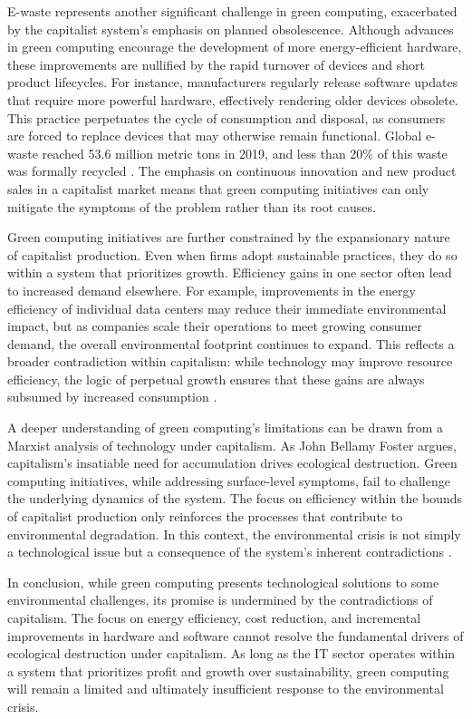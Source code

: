 \begin{refsection}
E-waste represents another significant challenge in green computing, exacerbated by the capitalist system’s emphasis on planned obsolescence. Although advances in green computing encourage the development of more energy-efficient hardware, these improvements are nullified by the rapid turnover of devices and short product lifecycles. For instance, manufacturers regularly release software updates that require more powerful hardware, effectively rendering older devices obsolete. This practice perpetuates the cycle of consumption and disposal, as consumers are forced to replace devices that may otherwise remain functional. Global e-waste reached 53.6 million metric tons in 2019, and less than 20\% of this waste was formally recycled \cite[pp.~2-4]{forti2020global}. The emphasis on continuous innovation and new product sales in a capitalist market means that green computing initiatives can only mitigate the symptoms of the problem rather than its root causes.

Green computing initiatives are further constrained by the expansionary nature of capitalist production. Even when firms adopt sustainable practices, they do so within a system that prioritizes growth. Efficiency gains in one sector often lead to increased demand elsewhere. For example, improvements in the energy efficiency of individual data centers may reduce their immediate environmental impact, but as companies scale their operations to meet growing consumer demand, the overall environmental footprint continues to expand. This reflects a broader contradiction within capitalism: while technology may improve resource efficiency, the logic of perpetual growth ensures that these gains are always subsumed by increased consumption \cite[pp.~84-87]{foster2000ecology}.

A deeper understanding of green computing’s limitations can be drawn from a Marxist analysis of technology under capitalism. As John Bellamy Foster argues, capitalism’s insatiable need for accumulation drives ecological destruction. Green computing initiatives, while addressing surface-level symptoms, fail to challenge the underlying dynamics of the system. The focus on efficiency within the bounds of capitalist production only reinforces the processes that contribute to environmental degradation. In this context, the environmental crisis is not simply a technological issue but a consequence of the system’s inherent contradictions \cite[pp.~34-37]{foster2000ecology}.

In conclusion, while green computing presents technological solutions to some environmental challenges, its promise is undermined by the contradictions of capitalism. The focus on energy efficiency, cost reduction, and incremental improvements in hardware and software cannot resolve the fundamental drivers of ecological destruction under capitalism. As long as the IT sector operates within a system that prioritizes profit and growth over sustainability, green computing will remain a limited and ultimately insufficient response to the environmental crisis.


\end{refsection}
